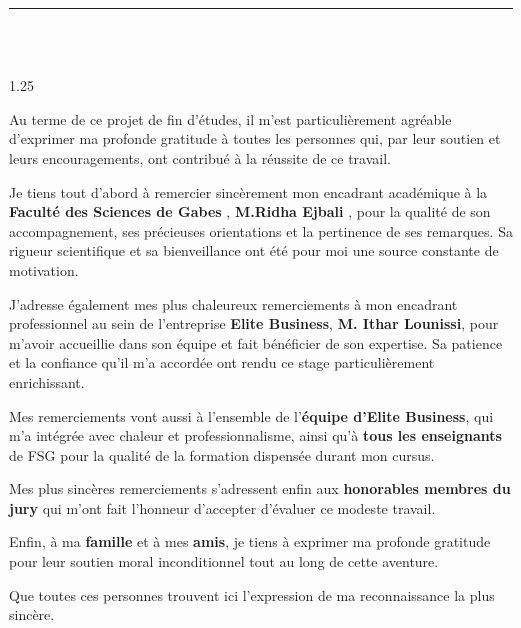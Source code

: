 \documentclass[12pt, oneside, a4paper]{report}
\begin{document}
\noindent\rule[-0.2cm]{0.45cm}{1.2cm}\hspace{0.15cm}%
\raisebox{0.85cm}{\rule{0.85\textwidth}{0.5pt}}\\[0.3cm]
\noindent{}\\[1.5cm]

\begin{spacing}{1.25} %

Au terme de ce projet de fin d'études, il m'est particulièrement agréable d'exprimer ma profonde gratitude à toutes les personnes qui, par leur soutien et leurs encouragements, ont contribué à la réussite de ce travail.

Je tiens tout d'abord à remercier sincèrement mon encadrant académique à la \textbf{Faculté des Sciences de Gabes }, \textbf{M.Ridha Ejbali }, pour la qualité de son accompagnement, ses précieuses orientations et la pertinence de ses remarques. Sa rigueur scientifique et sa bienveillance ont été pour moi une source constante de motivation.

J'adresse également mes plus chaleureux remerciements à mon encadrant professionnel au sein de l'entreprise \textbf{Elite Business}, \textbf{M. Ithar Lounissi}, pour m'avoir accueillie dans son équipe et fait bénéficier de son expertise. Sa patience et la confiance qu'il m'a accordée ont rendu ce stage particulièrement enrichissant.

Mes remerciements vont aussi à l'ensemble de l'\textbf{équipe d'Elite Business}, qui m'a intégrée avec chaleur et professionnalisme, ainsi qu'à \textbf{tous les enseignants} de FSG pour la qualité de la formation dispensée durant mon cursus.

Mes plus sincères remerciements s'adressent enfin aux \textbf{honorables membres du jury} qui m'ont fait l'honneur d'accepter d'évaluer ce modeste travail.

Enfin, à ma \textbf{famille} et à mes \textbf{amis}, je tiens à exprimer ma profonde gratitude pour leur soutien moral inconditionnel tout au long de cette aventure.

Que toutes ces personnes trouvent ici l'expression de ma reconnaissance la plus sincère.

\end{spacing}

\vspace{1.5cm}
\end{document}
